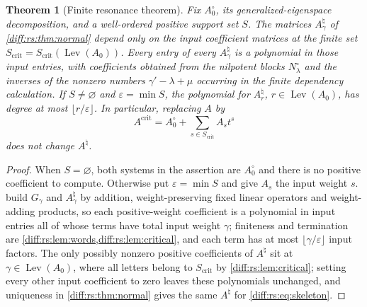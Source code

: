 \documentclass[11pt,letterpaper]{article}
\numberwithin{equation}{section}
\newtheorem{theorem}{Theorem}[section]
\theoremstyle{definition}
\theoremstyle{remark}
\newcommand{\Lev}{\operatorname{Lev}}
\newcommand{\crit}{\mathrm{crit}}
\begin{document}
\begin{theorem}[Finite resonance theorem]
\label{diff:rs:thm:finite}
Fix $A_{0}^{\circ}$, its generalized-eigenspace decomposition, and a
well-ordered positive support set $S$. The matrices $A^{\natural}_{\gamma}$ of
\cref{diff:rs:thm:normal} depend only on the input coefficient matrices at the
finite set $S_{\crit}=S_{\crit}(\Lev(A_{0}))$. Every entry of every
$A^{\natural}_{\gamma}$ is a polynomial in those input entries, with
coefficients obtained from the nilpotent blocks $N^{\circ}_{\lambda}$ and the
inverses of the nonzero numbers $\gamma'-\lambda+\mu$ occurring in the finite
dependency calculation. If $S\neq\varnothing$ and $\varepsilon=\min S$, the
polynomial for $A^{\natural}_{r}$, $r\in\Lev(A_{0})$, has degree at most
$\lfloor r/\varepsilon\rfloor$. In particular, replacing $A$ by
\begin{equation}\label{diff:rs:eq:skeleton}
 A^{\crit}=A_{0}^{\circ}+\sum_{s\in S_{\crit}}A_{s}t^{s}
\end{equation}
does not change $A^{\natural}$.
\end{theorem}
\begin{proof}
When $S=\varnothing$, both systems in the assertion are
$A_{0}^{\circ}$ and there is no positive coefficient to compute.
Otherwise put $\varepsilon=\min S$ and give $A_{s}$ the input weight $s$.
 build $G_{\gamma}$ and
$A^{\natural}_{\gamma}$ by addition, weight-preserving fixed linear operators
and weight-adding products, so each positive-weight coefficient is a
polynomial in input entries all of whose terms have total input weight
$\gamma$; finiteness and termination are
\cref{diff:rs:lem:words,diff:rs:lem:critical}, and each term has at most
$\lfloor\gamma/\varepsilon\rfloor$ input factors. The only possibly nonzero
positive coefficients of $A^{\natural}$ sit at $\gamma\in\Lev(A_{0})$, where all
letters belong to $S_{\crit}$ by \cref{diff:rs:lem:critical}; setting every
other input coefficient to zero leaves these polynomials unchanged, and
uniqueness in \cref{diff:rs:thm:normal} gives the same $A^{\natural}$ for
\cref{diff:rs:eq:skeleton}.
\end{proof}
\end{document}
